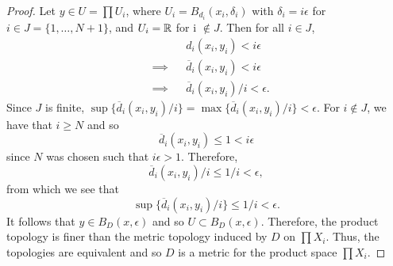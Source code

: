 \begin{solution}
\begin{proof}
    Let $y \in U = \prod U_i$, where $U_i = B_{d_i}(x_i, \delta_i)$ with $\delta_i = i \epsilon$ for $i \in J = \{1, \ldots, N + 1\}$, and $U_i = \mathbb{R}$ for i $\not\in J$.
    Then for all $i \in J$,
    \begin{equation*}
      \begin{alignedat}{2}
        &           && d_i(x_i, y_i) < i \epsilon \\
        & \implies  && \overline{d}_i(x_i, y_i) < i \epsilon \\
        & \implies  && \overline{d}_i(x_i, y_i) / i < \epsilon.
      \end{alignedat}
    \end{equation*}
    Since $J$ is finite, $\sup\{\overline{d}_i(x_i, y_i) / i\} = \max\{\overline{d}_i(x_i, y_i) / i\} < \epsilon$.
    For $i \not\in J$, we have that $i \geq N$ and so
    \begin{equation*}
        \overline{d}_i(x_i, y_i) \leq 1 < i \epsilon
    \end{equation*}
    since $N$ was chosen such that $i \epsilon > 1$.
    Therefore,
    \begin{equation*}
      \overline{d}_i(x_i, y_i) / i \leq 1 / i < \epsilon,
    \end{equation*}
    from which we see that
    \begin{equation*}
      \sup\{\overline{d}_i(x_i, y_i) / i\} \leq 1 / i < \epsilon.
    \end{equation*}
    It follows that $y \in B_D(x, \epsilon)$ and so $U \subset B_D(x, \epsilon)$.
    Therefore, the product topology is finer than the metric topology induced by $D$ on $\prod X_i$.
    Thus, the topologies are equivalent and so $D$ is a metric for the product space $\prod X_i$.
  \end{proof}
\end{solution}
\newpage

